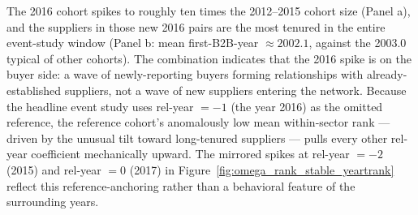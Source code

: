 The 2016 cohort spikes to roughly ten times the 2012--2015 cohort size (Panel a), and the suppliers in those new 2016 pairs are the most tenured in the entire event-study window (Panel b: mean first-B2B-year $\approx 2002.1$, against the 2003.0 typical of other cohorts). The combination indicates that the 2016 spike is on the buyer side: a wave of newly-reporting buyers forming relationships with already-established suppliers, not a wave of new suppliers entering the network. Because the headline event study uses rel-year $= -1$ (the year 2016) as the omitted reference, the reference cohort's anomalously low mean within-sector rank --- driven by the unusual tilt toward long-tenured suppliers --- pulls every other rel-year coefficient mechanically upward. The mirrored spikes at rel-year $= -2$ (2015) and rel-year $= 0$ (2017) in Figure~\ref{fig:omega_rank_stable_yeartrank} reflect this reference-anchoring rather than a behavioral feature of the surrounding years.
